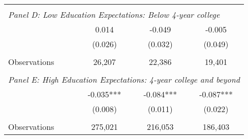 {\begin{tabular}{lccc}
&  &  &   \\
\multicolumn{4}{l}{\textit{Panel D: Low Education Expectations: Below 4-year college}} \\
\hspace{3mm}        &       0.014   &      -0.049   &      -0.005   \\
                    &     (0.026)   &     (0.032)   &     (0.049)   \\
                    &               &               &               \\
\hspace{3mm}Observations&      26,207   &      22,386   &      19,401   \\
 
&  &  &   \\
\multicolumn{4}{l}{\textit{Panel E: High Education Expectations: 4-year college and beyond}} \\
\hspace{3mm}        &      -0.035***&      -0.084***&      -0.087***\\
                    &     (0.008)   &     (0.011)   &     (0.022)   \\
                    &               &               &               \\
\hspace{3mm}Observations&     275,021   &     216,053   &     186,403   \\
 

\bottomrule
\end{tabular}
}
